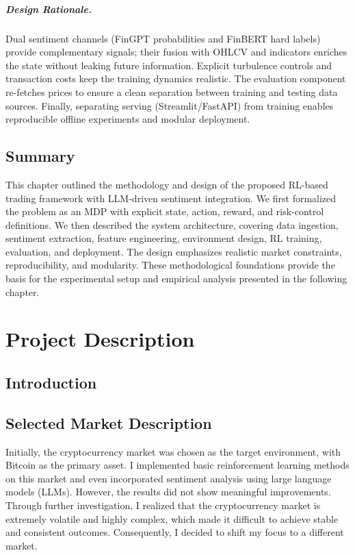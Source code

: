 \documentclass[12pt,a4paper]{report}
\begin{document}
\paragraph{Design Rationale.}
Dual sentiment channels (FinGPT probabilities and FinBERT hard labels) provide complementary signals; their fusion with OHLCV and indicators enriches the state without leaking future information. Explicit turbulence controls and transaction costs keep the training dynamics realistic. The evaluation component re-fetches prices to ensure a clean separation between training and testing data sources. Finally, separating serving (Streamlit/FastAPI) from training enables reproducible offline experiments and modular deployment.

\section{Summary}

This chapter outlined the methodology and design of the proposed RL-based trading framework with LLM-driven sentiment integration. We first formalized the problem as an MDP with explicit state, action, reward, and risk-control definitions. We then described the system architecture, covering data ingestion, sentiment extraction, feature engineering, environment design, RL training, evaluation, and deployment. The design emphasizes realistic market constraints, reproducibility, and modularity. These methodological foundations provide the basis for the experimental setup and empirical analysis presented in the following chapter.


\chapter{Project Description}

\section{Introduction}

\section{Selected Market Description}

Initially, the cryptocurrency market was chosen as the target environment, with Bitcoin as the primary asset. I implemented basic reinforcement learning methods on this market and even incorporated sentiment analysis using large language models (LLMs). However, the results did not show meaningful improvements. Through further investigation, I realized that the cryptocurrency market is extremely volatile and highly complex, which made it difficult to achieve stable and consistent outcomes. Consequently, I decided to shift my focus to a different market.
\end{document}
